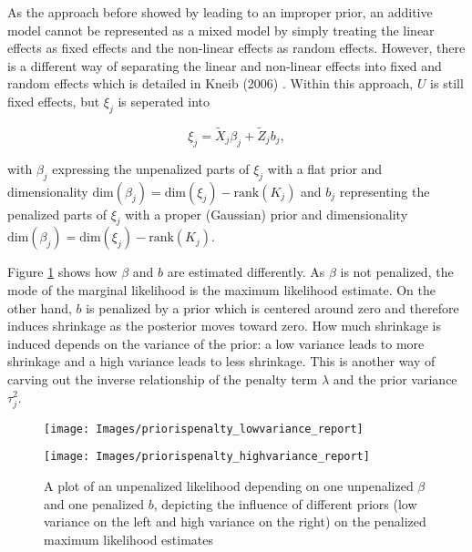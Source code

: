 \documentclass[12pt]{article}
\begin{document}
As the approach before showed by leading to an improper prior, an additive model cannot be represented as a mixed model by simply treating the linear effects as fixed effects and the non-linear effects as random effects. However, there is a different way of separating the linear and non-linear effects into fixed and random effects which is detailed in Kneib (2006) \cite{kneib2006mixed}. Within this approach, $U$ is still fixed effects, but $\xi_j$ is seperated into 

$$\xi_j = \tilde{X}_j \beta_j + \tilde{Z}_j b_j,\label{decomp}$$

with $\beta_j$ expressing the unpenalized parts of $\xi_j$ with a flat prior and dimensionality 
$\text{dim}(\beta_j) = \text{dim}(\xi_j) {-} \text{rank}(K_j)$ and $b_j$ representing the penalized parts of $\xi_j$ with a proper (Gaussian) prior and dimensionality $\text{dim}(\beta_j) = \text{dim}(\xi_j) {-} \text{rank}(K_j)$.

Figure \ref{priorispenalty} shows how $\beta$ and $b$ are estimated differently. As $\beta$ is not penalized, the mode of the marginal likelihood is the maximum likelihood estimate. On the other hand, $b$ is penalized by a prior which is centered around zero and therefore induces shrinkage as the posterior moves toward zero. How much shrinkage is induced depends on the variance of the prior: a low variance leads to more shrinkage and a high variance leads to less shrinkage. This is another way of carving out the inverse relationship of the penalty term $\lambda$ and the prior variance $\tau^2_j$.

\begin{figure}[b]
\centering
\hspace{-5.5em}
\begin{minipage}{.5\textwidth}
  \centering
  \texttt{[image: Images/priorispenalty\_lowvariance\_report]}
\end{minipage}%
\hspace{-2em}
\begin{minipage}{.5\textwidth}
  \centering
  \texttt{[image: Images/priorispenalty\_highvariance\_report]}
\end{minipage}
\vspace{-1em}
\caption[caption]{A plot of an unpenalized likelihood depending on one unpenalized $\beta$ and one penalized $b$, depicting the influence of different priors (low variance on the left and high variance on the right) on the penalized maximum likelihood estimates}\label{priorispenalty}
\end{figure}
\end{document}
